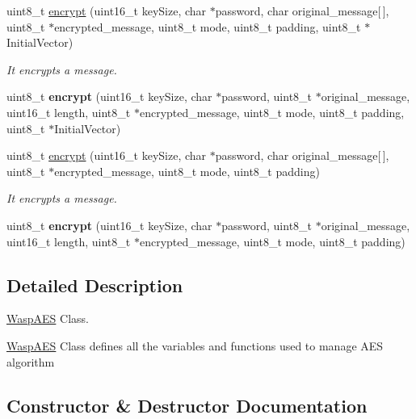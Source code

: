 \begin{DoxyCompactItemize}
\item 
uint8\+\_\+t \hyperlink{class_wasp_a_e_s_ae09329ad05218f0cc59ea239530129c3}{encrypt} (uint16\+\_\+t key\+Size, char $\ast$password, char original\+\_\+message\mbox{[}$\,$\mbox{]}, uint8\+\_\+t $\ast$encrypted\+\_\+message, uint8\+\_\+t mode, uint8\+\_\+t padding, uint8\+\_\+t $\ast$Initial\+Vector)
\begin{DoxyCompactList}\small\item\em It encrypts a message. \end{DoxyCompactList}\item 
uint8\+\_\+t {\bfseries encrypt} (uint16\+\_\+t key\+Size, char $\ast$password, uint8\+\_\+t $\ast$original\+\_\+message, uint16\+\_\+t length, uint8\+\_\+t $\ast$encrypted\+\_\+message, uint8\+\_\+t mode, uint8\+\_\+t padding, uint8\+\_\+t $\ast$Initial\+Vector)\hypertarget{class_wasp_a_e_s_abe5c470bffd6181994a5d1500ece032a}{}\label{class_wasp_a_e_s_abe5c470bffd6181994a5d1500ece032a}

\item 
uint8\+\_\+t \hyperlink{class_wasp_a_e_s_a945d30e8d855348df41d45a8a2841367}{encrypt} (uint16\+\_\+t key\+Size, char $\ast$password, char original\+\_\+message\mbox{[}$\,$\mbox{]}, uint8\+\_\+t $\ast$encrypted\+\_\+message, uint8\+\_\+t mode, uint8\+\_\+t padding)
\begin{DoxyCompactList}\small\item\em It encrypts a message. \end{DoxyCompactList}\item 
uint8\+\_\+t {\bfseries encrypt} (uint16\+\_\+t key\+Size, char $\ast$password, uint8\+\_\+t $\ast$original\+\_\+message, uint16\+\_\+t length, uint8\+\_\+t $\ast$encrypted\+\_\+message, uint8\+\_\+t mode, uint8\+\_\+t padding)\hypertarget{class_wasp_a_e_s_a39bc3c5528a7b20428513a7bc3e9ddd4}{}\label{class_wasp_a_e_s_a39bc3c5528a7b20428513a7bc3e9ddd4}

\end{DoxyCompactItemize}


\subsection{Detailed Description}
\hyperlink{class_wasp_a_e_s}{Wasp\+A\+ES} Class. 

\hyperlink{class_wasp_a_e_s}{Wasp\+A\+ES} Class defines all the variables and functions used to manage A\+ES algorithm 

\subsection{Constructor \& Destructor Documentation}
